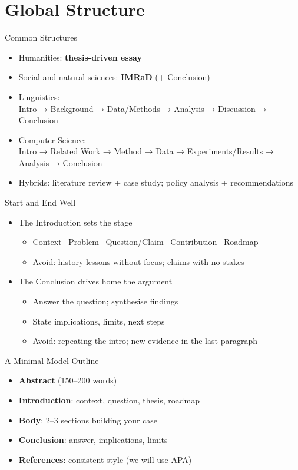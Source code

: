 \documentclass[aspectratio=169]{beamer}
\begin{document}
\section{Global Structure}

\begin{frame}{Common Structures}
\begin{itemize}
  \item Humanities: \textbf{thesis-driven essay}
  \item Social and natural sciences: \textbf{IMRaD} (+ Conclusion)
  \item Linguistics:
    \\   Intro → Background → Data/Methods → Analysis → Discussion → Conclusion
  \item Computer Science:
    \\ Intro → Related Work → Method → Data → Experiments/Results → Analysis → Conclusion
  \item Hybrids: literature review + case study; policy analysis + recommendations
\end{itemize}
\end{frame}

\begin{frame}{Start and End Well}
  \begin{itemize}
  \item The Introduction sets the stage
\begin{itemize}
  \item Context \textrightarrow\ Problem \textrightarrow\ Question/Claim \textrightarrow\ Contribution \textrightarrow\ Roadmap
  \item Avoid: history lessons without focus; claims with no stakes
\end{itemize}
\item The Conclusion drives home the argument
  \begin{itemize}
  \item Answer the question; synthesise findings
  \item State implications, limits, next steps
  \item Avoid: repeating the intro; new evidence in the last paragraph
  \end{itemize}
\end{itemize}
\end{frame}

\begin{frame}{A Minimal Model Outline}
\begin{itemize}
  \item \textbf{Abstract} (150--200 words)
  \item \textbf{Introduction}: context, question, thesis, roadmap
  \item \textbf{Body}: 2--3 sections building your case
  \item \textbf{Conclusion}: answer, implications, limits
  \item \textbf{References}: consistent style (we will use APA)
\end{itemize}
\end{frame}
\end{document}
